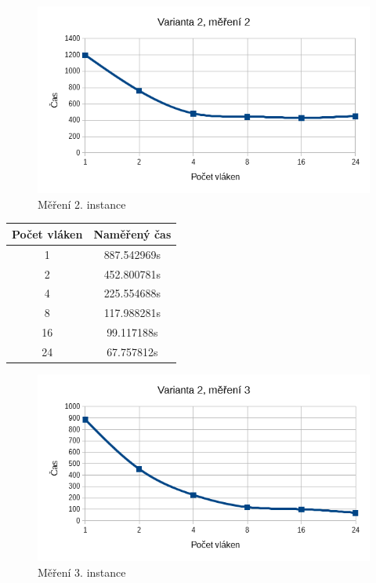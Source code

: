 \documentclass[12pt]{article}
\begin{document}
\begin{figure}[h]
  \begin{center}
    \includegraphics[width=12cm]{images/sse2.png}
    \caption{Měření 2. instance} 
  \end{center}
\end{figure}



\begin{center}
\begin{tabular}{ c | c }
\textbf{Počet vláken} & \textbf{Naměřený čas} \\ \hline \hline 
1 & 887.542969s \\ \hline
2 & 452.800781s \\ \hline
4 & 225.554688s \\ \hline
8 & 117.988281s \\ \hline
16 & 99.117188s \\ \hline
24 & 67.757812s \\ \hline
\end{tabular}
\end{center}

\begin{figure}[h]
  \begin{center}
     \includegraphics[width=12cm]{images/sse3.png}
    \caption{Měření 3. instance} 
  \end{center}
\end{figure}
\end{document}
